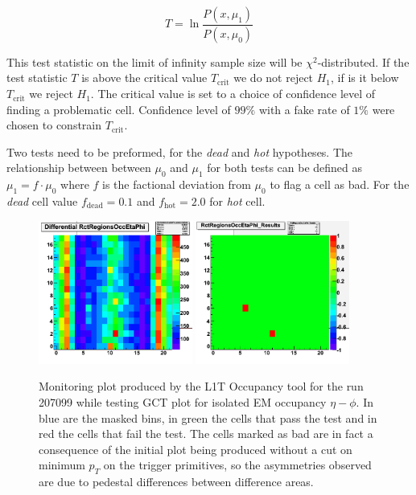 \begin{equation}
T=\ln\frac{P(x,\mu_1)}{P(x,\mu_0)}
\label{EQUATION:TechnicalWork_Occupancy_LogLikelihoodRatio}
\end{equation}

This test statistic on the limit of infinity sample size will be $\chi^2$-distributed. If the test statistic $T$ is above the critical value $T_{\text{crit}}$ we do not reject $H_1$, if is it below $T_{\text{crit}}$ we reject $H_1$. The critical value is set to a choice of confidence level of finding a problematic cell. Confidence level of $99\%$ with a fake rate of $1\%$ were chosen to constrain $T_{\text{crit}}$.

Two tests need to be preformed, for the \textit{dead} and \textit{hot} hypotheses. The relationship between between $\mu_0$ and $\mu_1$ for both tests can be defined as $\mu_1=f \cdot \mu_0$ where $f$ is the factional deviation from $\mu_0$ to flag a cell as bad. For the \textit{dead} cell value $f_{\text{dead}}=0.1$ and $f_{\text{hot}}=2.0$ for \textit{hot} cell.

\begin{figure}[!htb]
\centering
\includegraphics[width=0.45\textwidth]{Chapter03/L1TOnline/Images/L1TOccupancy_Diff.png}
\includegraphics[width=0.45\textwidth]{Chapter03/L1TOnline/Images/L1TOccupancy_Results.png}
\caption{Monitoring plot produced by the L1T Occupancy tool for the run 207099 while testing GCT plot for isolated
EM occupancy $\eta-\phi$. In blue are the masked bins, in green the cells that pass the test and in red the cells
that fail the test. The cells marked as bad are in fact a consequence of the initial plot being produced without
a cut on minimum $p_T$ on the trigger primitives, so the asymmetries observed are due to pedestal differences between
difference areas.}
\label{figure_ServiceWork_L1TOccupancy}
\end{figure}


